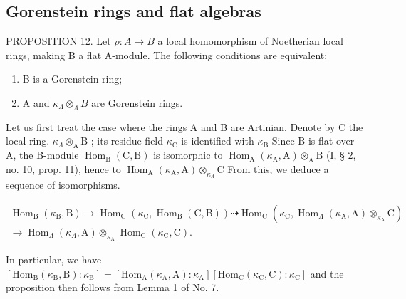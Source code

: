 \subsection{Gorenstein rings and flat algebras}

PROPOSITION 12. Let \(\rho: A \to B\) a local homomorphism of Noetherian local rings, making B a flat A-module. The following conditions are equivalent:

\begin{enumerate}
\def\labelenumi{(\roman{enumi})}
\item
  B is a Gorenstein ring;
\item
  A and \(\kappa_{\Lambda} \otimes_{\Lambda} B\) are Gorenstein rings.
\end{enumerate}

Let us first treat the case where the rings A and B are Artinian. Denote by C the local ring. \(\kappa_{\Lambda} \otimes_{\mathrm{A}} \mathrm{B}\) ; its residue field \(\kappa_{\mathrm{C}}\) is identified with \(\kappa_{\mathrm{B}}\) Since B is flat over A, the B-module \(\operatorname{Hom}_{\mathrm{B}}(\mathrm{C}, \mathrm{B})\) is isomorphic to \(\operatorname{Hom}_{\mathrm{A}}(\kappa_{\mathrm{A}}, \mathrm{A}) \otimes_{\mathrm{A}} \mathrm{B}\) (I, § 2, no. 10, prop. 11), hence to \(\operatorname{Hom}_{\mathrm{A}}(\kappa_{\mathrm{A}}, \mathrm{A}) \otimes_{\kappa_{\Lambda}} \mathrm{C}\) From this, we deduce a sequence of isomorphisms.

\[
\begin{array}{c} \operatorname{Hom} _ {\mathrm{B}} (\kappa_ {\mathrm{B}}, \mathrm{B}) \longrightarrow \operatorname{Hom} _ {\mathrm{C}} (\kappa_ {\mathrm{C}}, \operatorname{Hom} _ {\mathrm{B}} (\mathrm{C}, \mathrm{B})) \dashrightarrow \operatorname{Hom} _ {\mathrm{C}} (\kappa_ {\mathrm{C}}, \operatorname{Hom} _ {\Lambda} (\kappa_ {\mathrm{A}}, \mathrm{A}) \otimes_ {\kappa_ {\mathrm{A}}} \mathrm{C}) \\ \longrightarrow \operatorname{Hom} _ {\Lambda} (\kappa_ {\Lambda}, \mathrm{A}) \otimes_ {\kappa_ {\mathrm{A}}} \operatorname{Hom} _ {\mathrm{C}} (\kappa_ {\mathrm{C}}, \mathrm{C}). \end{array}
\]

In particular, we have \(\left[\mathrm{Hom}_{\mathrm{B}}(\kappa_{\mathrm{B}},\mathrm{B}):\kappa_{\mathrm{B}}\right] = \left[\mathrm{Hom}_{\mathrm{A}}(\kappa_{\mathrm{A}},\mathrm{A}):\kappa_{\mathrm{A}}\right]\left[\mathrm{Hom}_{\mathrm{C}}(\kappa_{\mathrm{C}},\mathrm{C}):\kappa_{\mathrm{C}}\right]\) and the proposition then follows from Lemma 1 of No. 7.

